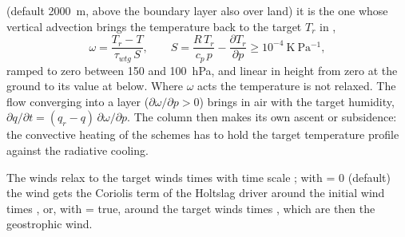 (default 2000~m, above the boundary layer also over land)
it is the one whose vertical advection
brings the temperature back to the target $T_r$ in ,
\begin{equation}
  \omega = \frac{T_r - T}{\tau_{wtg}\,S}, \qquad
  S = \frac{R\,T_r}{c_p\,p} - \frac{\partial T_r}{\partial p}
  \geq 10^{-4}~\mathrm{K~Pa^{-1}},
\end{equation}
ramped to zero between 150 and 100~hPa, and linear in height from zero
at the ground to its value at  below. Where $\omega$ acts the
temperature is not relaxed. The flow converging into a layer
($\partial\omega/\partial p > 0$) brings in air with the target
humidity, $\partial q/\partial t = (q_r - q)\,\partial\omega/\partial p$.
The column then makes its own ascent or subsidence: the convective
heating of the schemes has to hold the target temperature profile
against the radiative cooling.

The winds relax to the target winds times  with time scale
; with  = 0 (default) the wind gets the
Coriolis term of the Holtslag driver around the initial wind times
, or, with  = true, around the target winds
times , which are then the geostrophic wind.

